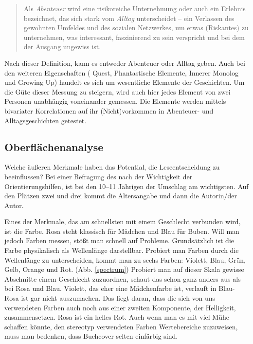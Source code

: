 \blockcquote[Hervorhebung P.\,F.][\texttt{\href{http://de.wikipedia.org/wiki/abenteuer}{/wiki/abenteuer}}]{de.wiki}{Als \emph{Abenteuer} \textelp{} wird eine risikoreiche Unternehmung oder auch ein Erlebnis bezeichnet, das sich stark vom \emph{Alltag} unterscheidet -- ein Verlassen des gewohnten Umfeldes und des sozialen Netzwerkes, um etwas (Riskantes) zu unternehmen, was interessant, faszinierend zu sein verspricht und bei dem der Ausgang ungewiss ist.}

Nach dieser Definition, kann es entweder Abenteuer oder Alltag geben.
Auch bei den weiteren Eigenschaften ( Quest, Phantastische Elemente,
Innerer Monolog und Growing Up) handelt es sich um wesentliche Elemente
der Geschichten. Um die Güte dieser Messung zu steigern, wird auch hier
jedes Element von zwei Personen unabhängig voneinander gemessen. Die
Elemente werden mittels bivariater Korrelationen auf ihr
(Nicht)vorkommen in Abenteuer- und Alltagsgeschichten getestet.

\subsection{Oberflächenanalyse}

\label{meth.merkmale} Welche äußeren Merkmale haben das Potential, die
Leseentscheidung zu beeinflussen? Bei einer Befragung des
\textcite[32-39]{Boersenverein2007} nach der Wichtigkeit der
Orientierungshilfen, ist bei den 10--11 Jährigen der Umschlag am
wichtigsten. Auf den Plätzen zwei und drei kommt die Altersangabe und
dann die Autorin/der Autor.

Eines der Merkmale, das am schnellsten mit einem Geschlecht verbunden
wird, ist die Farbe. Rosa steht klassisch für Mädchen und Blau für
Buben. Will man jedoch Farben messen, stößt man schnell auf Probleme.
Grundsätzlich ist die Farbe physikalisch als Wellenlänge darstellbar.
Probiert man Farben durch die Wellenlänge zu unterscheiden, kommt man zu
sechs Farben: Violett, Blau, Grün, Gelb, Orange und Rot. (Abb.
\ref{spectrum}) Probiert man auf dieser Skala gewisse Abschnitte einem
Geschlecht zuzuordnen, schaut das schon ganz anders aus als bei Rosa und
Blau. Violett, das eher eine Mädchenfarbe ist, verlauft in Blau- Rosa
ist gar nicht auszumachen. Das liegt daran, dass die sich von uns
verwendeten Farben auch noch aus einer zweiten Komponente, der
Helligkeit, zusammensetzen. Rosa ist ein helles Rot. Auch wenn man es
mit viel Mühe schaffen könnte, den stereotyp verwendeten Farben
Wertebereiche zuzuweisen, muss man bedenken, dass Buchcover selten
einfärbig sind.


